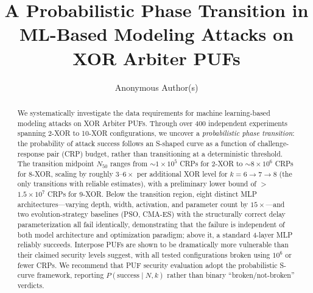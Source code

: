 \documentclass[conference]{IEEEtran}
\title{A Probabilistic Phase Transition in ML-Based Modeling Attacks on XOR Arbiter PUFs}
\author{Anonymous Author(s)}
\begin{document}
\maketitle

\begin{abstract}
We systematically investigate the data requirements for machine learning-based
modeling attacks on XOR Arbiter PUFs. Through over 400 independent experiments
spanning 2-XOR to 10-XOR configurations, we uncover a \emph{probabilistic phase
transition}: the probability of attack success follows an S-shaped curve as a
function of challenge-response pair (CRP) budget, rather than transitioning at
a deterministic threshold. The transition midpoint $N_{50}$ ranges from
$\sim$$1\times10^5$ CRPs for 2-XOR to $\sim$$8\times10^6$ CRPs for 8-XOR,
scaling by roughly $3$--$6\times$ per additional XOR level for
$k = 6\to7\to8$ (the only transitions with reliable estimates), with a
preliminary lower bound of $>$$1.5\times10^7$ CRPs for 9-XOR.
Below the transition region, eight distinct MLP
architectures---varying depth, width, activation, and parameter count by
$15\times$---and two evolution-strategy baselines (PSO, CMA-ES) with the
structurally correct delay parameterization all fail identically,
demonstrating that the failure is independent of both model architecture and
optimization paradigm; above it, a standard 4-layer MLP reliably
succeeds. Interpose PUFs are shown to be dramatically more vulnerable than
their claimed security levels suggest, with all tested configurations broken
using $10^6$ or fewer CRPs. We recommend that PUF security evaluation adopt the
probabilistic S-curve framework, reporting $P(\text{success} \mid N, k)$
rather than binary ``broken/not-broken'' verdicts.
\end{abstract}











\end{document}
